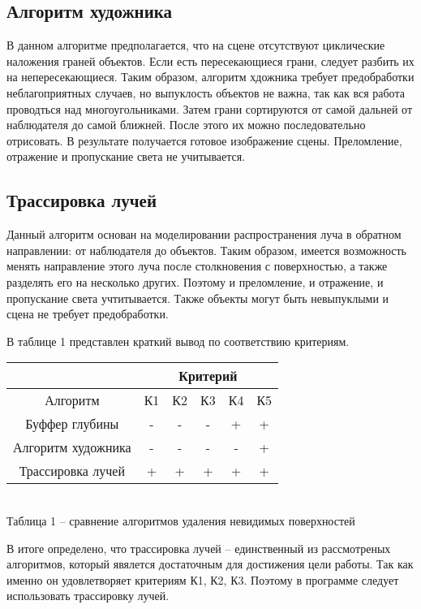 {    \subsection{Алгоритм художника} {
        В данном алгоритме предполагается, что на сцене отсутствуют циклические
        наложения граней объектов.
        Если есть пересекающиеся грани, следует разбить их на непересекающиеся.
        Таким образом, алгоритм хдожника требует предобработки неблагоприятных
        случаев, но выпуклость объектов не важна,
        так как вся работа проводться над многоугольниками.
        Затем грани сортируются от самой дальней от наблюдателя до самой ближней.
        После этого их можно последовательно отрисовать.
        В результате получается готовое изображение сцены.
        Преломление, отражение и пропускание света не учитывается.
    }

    \subsection{Трассировка лучей} {
        Данный алгоритм основан на моделировании распространения луча в
        обратном направлении: от наблюдателя до объектов.
        Таким образом, имеется возможность менять направление этого луча
        после столкновения с поверхностью, а также разделять его на несколько других.
        Поэтому и преломление, и отражение, и пропускание света учтитывается.
        Также объекты могут быть невыпуклыми и сцена не требует предобработки.
    }
    
    В таблице 1 представлен краткий вывод по соответствию критериям.
    
    \begin{center}
        \begin{tabular} { |c|c|c|c|c|c| }
            \hline
            \hspace{0pt} & \multicolumn{5}{|c|}{Критерий} \\
            \hline
            Алгоритм & К1 & К2 & К3 & К4 & К5 \\
            \hline
            Буффер глубины & - & - & - & + & + \\
            \hline
            Алгоритм художника & - & - & - & - & +  \\
            \hline
            Трассировка лучей & + & + & + & + & + \\
            \hline
        \end{tabular}
        \\
        \vspace{2mm}
        \small { Таблица 1 -- сравнение алгоритмов удаления невидимых поверхностей }
    \end{center}

    В итоге определено, что трассировка лучей -- единственный из рассмотреных алгоритмов, который явялется достаточным для достижения цели работы.
    Так как именно он удовлетворяет критериям К1, К2, К3.
    Поэтому в программе следует использовать трассировку лучей.
}